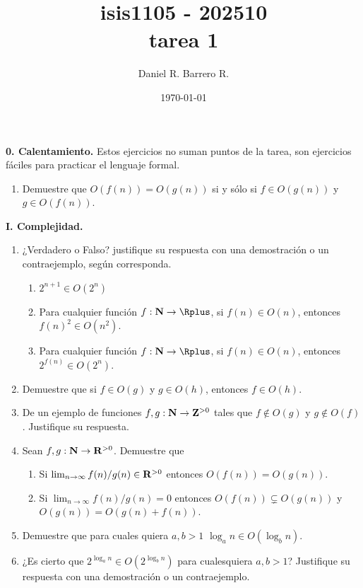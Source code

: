 \documentclass{amsart}
\title{isis1105 - 202510 \\ tarea 1}
\author{Daniel R. Barrero R.}
\date{\today}
\begin{document}
\maketitle

\textbf{0. Calentamiento.} Estos ejercicios no suman puntos de la tarea, son ejercicios fáciles para practicar el lenguaje formal.
\begin{enumerate}
	\item Demuestre que $O(f(n)) = O(g(n))$ si y sólo si $f \in O(g(n))$ y $g \in O(f(n))$.
\end{enumerate}

\bigskip

\textbf{I. Complejidad.}

\begin{enumerate}
	\item ¿Verdadero o Falso? justifique su respuesta con una demostración o un contraejemplo, según corresponda.
		\begin{enumerate}
			\item $2^{n+1} \in O(2^n)$
			\item Para cualquier función $f : \NN \to \Rplus$, si $f(n) \in O(n)$, entonces $f(n)^2 \in O(n^2)$.
			\item Para cualquier función $f : \NN \to \Rplus$, si $f(n) \in O(n)$, entonces $2^{f(n)} \in O(2^n)$.
		\end{enumerate}
	\item Demuestre que si $f \in O(g)$ y $g \in O(h)$, entonces $f \in O(h)$.
	\item De un ejemplo de funciones $f,g : \mathbf{N} \to \mathbf{Z}^{>0}$ tales que $f \notin O(g)$ y $g \notin O(f)$. Justifique su respuesta.
	\item Sean $f,g : \mathbf{N} \to \mathbf{R}^{>0}$. Demuestre que
		\begin{enumerate}
			\item Si $\lim_{n \to \infty} f(n)/g(n) \in \mathbf{R}^{>0}$ entonces $O(f(n)) = O(g(n))$.
			\item Si $\lim_{n \to \infty} f(n)/g(n) = 0$ entonces $O(f(n)) \subsetneq O(g(n))$ y $O(g(n)) = O(g(n)+f(n))$.

		\end{enumerate}
	\item Demuestre que para cuales quiera $a,b>1$ $\log_a n \in O(\log_b n)$.
	\item ¿Es cierto que $2^{\log_a n} \in O(2^{\log_b n})$ para cualesquiera $a,b > 1$? Justifique su respuesta con una demostración o un contraejemplo.
\end{enumerate}
\end{document}
